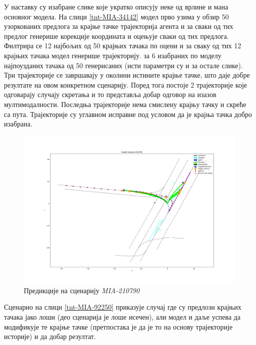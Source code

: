 \documentclass[11pt,oneside]{memoir}
\begin{document}
У наставку су изабране слике које укратко описују неке од врлине и мана основног модела. На слици \ref{tnt-MIA-34142} модел прво
узима у обзир 50 узоркованих предлога за крајње тачке трајекторија агента и за сваки од тих предлог генерише корекције координата
и оцењује сваки од тих предлога. Филтрира се 12 најбољих од 50 крајњих тачака по оцени и за сваку од тих 12 крајњих тачака
модел генерише трајекторију. за 6 изабраних по моделу најпоузданих тачака од 50 генерисаних (исти параметри су и за остале слике). Три трајекторије
се завршавају у околини истините крајње тачке, што даје добре резултате на овом конкретном сценарију. Поред тога постоје
2 трајекторије које одговарају случају скретања и то представља добар одговор на изазов мултимодалности. Последња трајекторије
нема смислену крајњу тачку и скреће са пута. Трајекторије су углавном исправне под условом да је крајња тачка добро изабрана.  

\begin{figure}[H]
  \centering
  \includegraphics[width=1.0\textwidth]{images/result_MIA_210790_scenario.png}
  \caption{Предикције на сценарију \textit{MIA-210790} \label{tnt-MIA-210790}}
\end{figure}

Сценарио на слици \ref{tnt-MIA-92250} приказује случај где су предлози крајњих тачака јако лоши (део сценарија је лоше исечен), али 
модел и даље успева да модификује те крајње тачке (претпостака је да је то на основу трајекторије историје) и да добар резултат.
\end{document}
